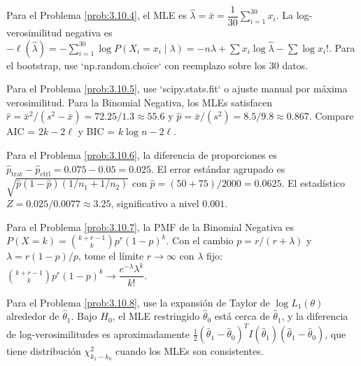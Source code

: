 \begin{sugerencia}
	\label{sug:3.10.4}
	Para el Problema \ref{prob:3.10.4}, el MLE es $\hat{\lambda} = \bar{x} = \dfrac{1}{30}\sum_{i=1}^{30} x_{i}$. La log-verosimilitud negativa es $-\ell(\hat{\lambda}) = -\sum_{i=1}^{30}\log P(X_{i} = x_{i} \mid \lambda) = -n\hat{\lambda} + \sum x_{i} \log \hat{\lambda} - \sum \log x_{i}!$. Para el bootstrap, use `np.random.choice` con reemplazo sobre los 30 datos.
\end{sugerencia}

\begin{sugerencia}
	\label{sug:3.10.5}
	Para el Problema \ref{prob:3.10.5}, use `scipy.stats.fit` o ajuste manual por máxima verosimilitud. Para la Binomial Negativa, los MLEs satisfacen $\hat{r} = \bar{x}^{2}/(s^{2} - \bar{x}) = 72.25/1.3 \approx 55.6$ y $\hat{p} = \bar{x}/(s^{2}) = 8.5/9.8 \approx 0.867$. Compare AIC = $2k - 2\ell$ y BIC = $k \log n - 2\ell$.
\end{sugerencia}

\begin{sugerencia}
	\label{sug:3.10.6}
	Para el Problema \ref{prob:3.10.6}, la diferencia de proporciones es $\hat{p}_{\text{trat}} - \hat{p}_{\text{ctrl}} = 0.075 - 0.05 = 0.025$. El error estándar agrupado es $\sqrt{\hat{p}(1-\hat{p})(1/n_{1} + 1/n_{2})}$ con $\hat{p} = (50 + 75)/2000 = 0.0625$. El estadístico $Z = 0.025/0.0077 \approx 3.25$, significativo a nivel $0.001$.
\end{sugerencia}

\begin{sugerencia}
	\label{sug:3.10.7}
	Para el Problema \ref{prob:3.10.7}, la PMF de la Binomial Negativa es $P(X = k) = \binom{k + r - 1}{k} p^{r}(1-p)^{k}$. Con el cambio $p = r/(r + \lambda)$ y $\lambda = r(1-p)/p$, tome el límite $r \to \infty$ con $\lambda$ fijo: $\binom{k+r-1}{k} p^{r} (1-p)^{k} \to \dfrac{e^{-\lambda} \lambda^{k}}{k!}$.
\end{sugerencia}

\begin{sugerencia}
	\label{sug:3.10.8}
	Para el Problema \ref{prob:3.10.8}, use la expansión de Taylor de $\log L_{1}(\theta)$ alrededor de $\hat{\theta}_{1}$. Bajo $H_{0}$, el MLE restringido $\hat{\theta}_{0}$ está cerca de $\hat{\theta}_{1}$, y la diferencia de log-verosimilitudes es aproximadamente $\frac{1}{2}(\hat{\theta}_{1} - \hat{\theta}_{0})^{T} I(\hat{\theta}_{1}) (\hat{\theta}_{1} - \hat{\theta}_{0})$, que tiene distribución $\chi^{2}_{k_{1} - k_{0}}$ cuando los MLEs son consistentes.
\end{sugerencia}

